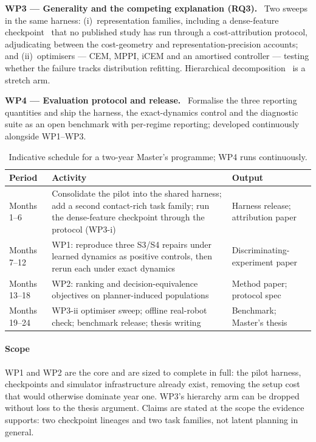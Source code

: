 \documentclass[11pt,letterpaper]{article}
\begin{document}
\vspace{2pt}\noindent\textbf{WP3 --- Generality and the competing explanation (RQ3).}~ Two sweeps in the same harness: (i)~representation families, including a
dense-feature checkpoint~\citep{murlabadia2026vjepa21} that no published study
has run through a cost-attribution protocol, adjudicating between the
cost-geometry and representation-precision accounts; and (ii)~optimisers --- CEM,
MPPI, iCEM and an amortised controller --- testing whether the failure tracks
distribution refitting. Hierarchical decomposition~\citep{zhang2026hwm} is a
stretch arm.

\vspace{2pt}\noindent\textbf{WP4 --- Evaluation protocol and release.}~ Formalise the three reporting quantities and ship the harness,
the exact-dynamics control and the diagnostic suite as an open benchmark with
per-regime reporting; developed continuously alongside WP1--WP3.

\begin{table}[!ht]
\centering\small
\caption{Indicative schedule for a two-year Master's programme; WP4 runs
continuously.}\label{tab:plan}
\begin{tabularx}{\textwidth}{@{}L{2.05cm} Y L{3.55cm}@{}}
\toprule
Period & Activity & Output \\
\midrule
Months 1--6 & Consolidate the pilot into the shared harness; add a second
contact-rich task family; run the dense-feature checkpoint through the protocol
(WP3-i) & Harness release; attribution paper \\
Months 7--12 & WP1: reproduce three S3/S4 repairs under learned dynamics as
positive controls, then rerun each under exact dynamics &
Discriminating-experiment paper \\
Months 13--18 & WP2: ranking and decision-equivalence objectives on
planner-induced populations & Method paper; protocol spec \\
Months 19--24 & WP3-ii optimiser sweep; offline real-robot check; benchmark
release; thesis writing & Benchmark; Master's thesis \\
\bottomrule
\end{tabularx}
\end{table}

\paragraph{Scope} WP1 and WP2 are the core and are sized to complete in full:
the pilot harness, checkpoints and simulator infrastructure already exist,
removing the setup cost that would otherwise dominate year one. WP3's hierarchy
arm can be dropped without loss to the thesis argument. Claims are stated at the
scope the evidence supports: two checkpoint lineages and two task families, not
latent planning in general.
\end{document}
